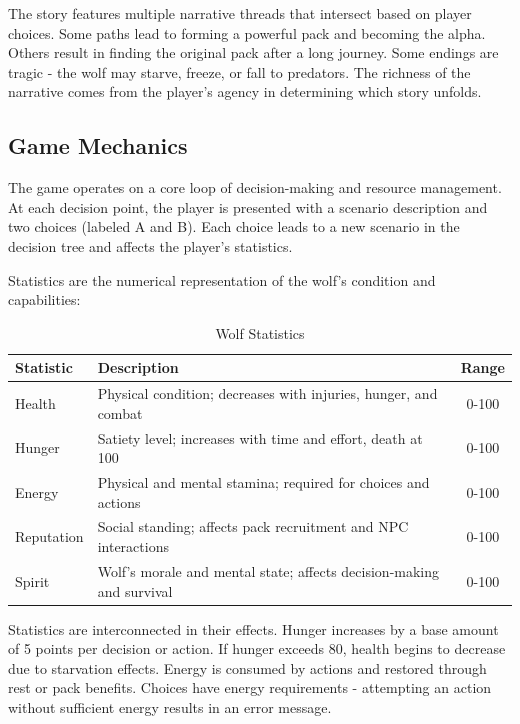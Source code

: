 \documentclass[12pt,a4paper]{article}
\begin{document}
The story features multiple narrative threads that intersect based on player choices. Some paths lead to forming a powerful pack and becoming the alpha. Others result in finding the original pack after a long journey. Some endings are tragic - the wolf may starve, freeze, or fall to predators. The richness of the narrative comes from the player's agency in determining which story unfolds.

\subsection{Game Mechanics}
The game operates on a core loop of decision-making and resource management. At each decision point, the player is presented with a scenario description and two choices (labeled A and B). Each choice leads to a new scenario in the decision tree and affects the player's statistics.

Statistics are the numerical representation of the wolf's condition and capabilities:

\begin{table}[h]
	\centering
	\caption{Wolf Statistics}
	\begin{tabular}{@{}lp{8cm}c@{}}
		\toprule
		\textbf{Statistic} & \textbf{Description}                                            & \textbf{Range} \\ \midrule
		Health             & Physical condition; decreases with injuries, hunger, and combat & 0-100          \\
		Hunger             & Satiety level; increases with time and effort, death at 100     & 0-100          \\
		Energy             & Physical and mental stamina; required for choices and actions   & 0-100          \\
		Reputation         & Social standing; affects pack recruitment and NPC interactions  & 0-100          \\
		Spirit             & Wolf's morale and mental state; affects decision-making and survival & 0-100       \\
		\bottomrule
	\end{tabular}
\end{table}

\vspace{0.3cm}

Statistics are interconnected in their effects. Hunger increases by a base amount of 5 points per decision or action. If hunger exceeds 80, health begins to decrease due to starvation effects. Energy is consumed by actions and restored through rest or pack benefits. Choices have energy requirements - attempting an action without sufficient energy results in an error message.
\end{document}
